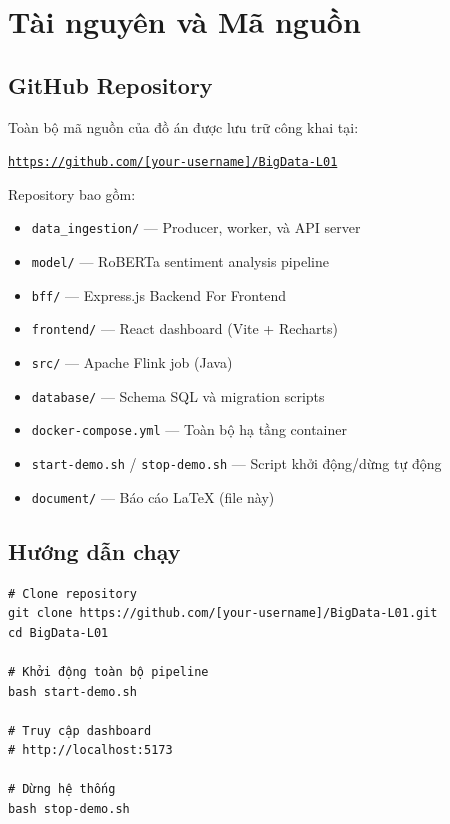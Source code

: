 \section*{Tài nguyên và Mã nguồn}

\subsection*{GitHub Repository}

Toàn bộ mã nguồn của đồ án được lưu trữ công khai tại:

\begin{center}
\large
\href{https://github.com/[your-username]/BigData-L01}{\texttt{https://github.com/[your-username]/BigData-L01}}
\end{center}

Repository bao gồm:

\begin{itemize}
    \item \texttt{data\_ingestion/} — Producer, worker, và API server
    \item \texttt{model/} — RoBERTa sentiment analysis pipeline
    \item \texttt{bff/} — Express.js Backend For Frontend
    \item \texttt{frontend/} — React dashboard (Vite + Recharts)
    \item \texttt{src/} — Apache Flink job (Java)
    \item \texttt{database/} — Schema SQL và migration scripts
    \item \texttt{docker-compose.yml} — Toàn bộ hạ tầng container
    \item \texttt{start-demo.sh} / \texttt{stop-demo.sh} — Script khởi động/dừng tự động
    \item \texttt{document/} — Báo cáo LaTeX (file này)
\end{itemize}

\subsection*{Hướng dẫn chạy}

\begin{verbatim}
# Clone repository
git clone https://github.com/[your-username]/BigData-L01.git
cd BigData-L01

# Khởi động toàn bộ pipeline
bash start-demo.sh

# Truy cập dashboard
# http://localhost:5173

# Dừng hệ thống
bash stop-demo.sh
\end{verbatim}

